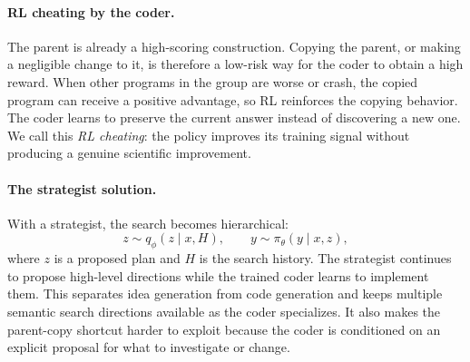 \paragraph{RL cheating by the coder.}
The parent is already a high-scoring construction. Copying the parent, or
making a negligible change to it, is therefore a low-risk way for the coder to
obtain a high reward. When other programs in the group are worse or crash, the
copied program can receive a positive advantage, so RL reinforces the copying
behavior. The coder learns to preserve the current answer instead of
discovering a new one. We call this \emph{RL cheating}: the policy improves its
training signal without producing a genuine scientific improvement.

\paragraph{The strategist solution.}
With a strategist, the search becomes hierarchical:
\[
z\sim q_\phi(z\mid x,H),
\qquad
y\sim\pi_\theta(y\mid x,z),
\]
where $z$ is a proposed plan and $H$ is the search history. The strategist
continues to propose high-level directions while the trained coder learns to
implement them. This separates idea generation from code generation and keeps
multiple semantic search directions available as the coder specializes. It
also makes the parent-copy shortcut harder to exploit because the coder is
conditioned on an explicit proposal for what to investigate or change.


